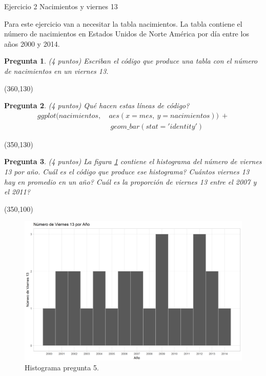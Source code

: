 \documentclass{article}
\newtheorem{pregunta}{Pregunta}
\begin{document}
\begin{topbot}
  \vspace{0.7em}
  Ejercicio 2 \quad Nacimientos y viernes 13
  \vspace{0.7em}
\end{topbot}

Para este ejercicio van a necesitar la tabla nacimientos. La tabla contiene el número de nacimientos en Estados Unidos de Norte América por día entre los años 2000 y 2014.
\begin{pregunta} (4 puntos)
Escriban el código que produce una tabla con el número de nacimientos en un viernes 13.
\end{pregunta}
\framebox(360,130){} \\
\par
\begin{pregunta} (4 puntos)
Qué hacen estas líneas de código?
\begin{align*}
  ggplot(nacimientos,\ & aes(x=mes, \ y=nacimientos)) \ + \\
    & \ geom\_bar(stat='identity')
\end{align*}

\end{pregunta}
\framebox(350,130){} \\

\begin{pregunta} (4 puntos)
La figura \ref{fig:hist} contiene el histograma del número de viernes 13 por año. Cuál es el código que produce ese histograma? Cuántos viernes 13 hay en promedio en un año? Cuál es la proporción de viernes 13 entre el 2007 y el 2011?
\end{pregunta}
\framebox(350,100){}
\begin{figure}[ht]
  \includegraphics[scale = 0.45] {Viernes13.png}
  \caption{Histograma pregunta 5. }
  \label{fig:hist}
\end{figure}
\end{document}
